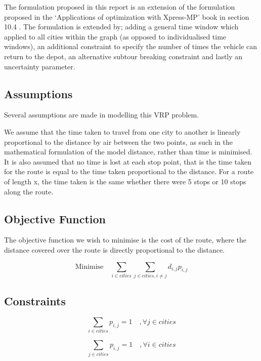 \documentclass[a4paper,11pt]{article}
\begin{document}
The formulation proposed in this report is an extension of the formulation proposed in the `Applications of optimization with Xpress-MP' book in section 10.4 \cite{gueret1999applications}. The formulation is extended by; adding a general time window which applied to all cities within the graph (as opposed to individualised time windows), an additional constraint to specify the number of times the vehicle can return to the depot, an alternative subtour breaking constraint and lastly an uncertainty parameter.

\subsection{Assumptions}
Several assumptions are made in modelling this VRP problem.

We assume that the time taken to travel from one city to another is linearly proportional to the distance by air between the two points, as such in the mathematical formulation of the model distance, rather than time is minimised. It is also assumed that no time is lost at each stop point, that is the time taken for the route is equal to the time taken proportional to the distance. For a route of length x, the time taken is the same whether there were 5 stops or 10 stops along the route. 


\subsection{Objective Function}

The objective function we wish to minimise is the cost of the route, where the distance covered over the route is directly proportional to the distance. 

\begin{equation}\label{eq1}
\textrm{Minimise} \quad \sum\limits_{i \in cities} \sum\limits_{j \in cities, i \neq j} d_{i,j} p_{i,j}
\end{equation}

\subsection{Constraints}

\begin{equation}\label{eq2}
\sum\limits_{i \in cities} p_{i,j} = 1 \quad , \forall j \in cities
\end{equation}

\begin{equation}\label{eq3}
\sum\limits_{j \in cities} p_{i,j} = 1 \quad , \forall i \in cities
\end{equation}
\end{document}
